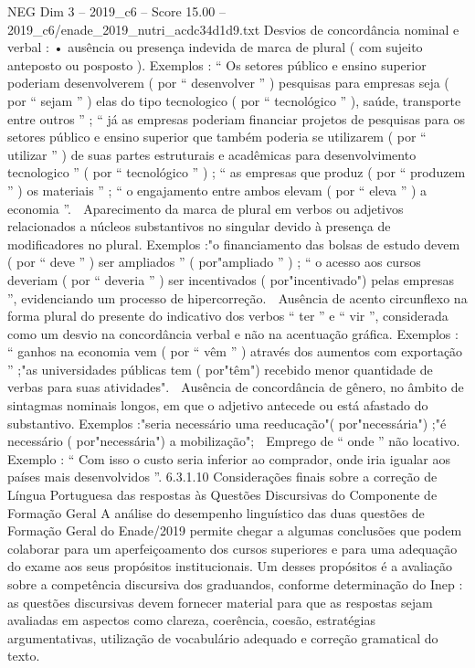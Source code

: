 \begin{textsample}{NEG Dim 3 – 2019\_c6 – Score 15.00 – 2019\_c6/enade\_2019\_nutri\_acdc34d1d9.txt}
Desvios de concordância nominal e verbal : • ausência ou presença indevida de marca de plural ( com sujeito anteposto ou posposto ).
Exemplos : “ Os setores público e ensino superior poderiam desenvolverem ( por “ desenvolver ” ) pesquisas para empresas seja ( por “ sejam ” ) elas do tipo tecnologico ( por “ tecnológico ” ), saúde, transporte entre outros ” ; “ já as empresas poderiam financiar projetos de pesquisas para os setores público e ensino superior que também poderia se utilizarem ( por “ utilizar ” ) de suas partes estruturais e acadêmicas para desenvolvimento tecnologico ” ( por “ tecnológico ” ) ; “ as empresas que produz ( por “ produzem ” ) os materiais ” ; “ o engajamento entre ambos elevam ( por “ eleva ” ) a economia ”.  Aparecimento da marca de plural em verbos ou adjetivos relacionados a núcleos substantivos no singular devido à presença de modificadores no plural.
Exemplos :"o financiamento das bolsas de estudo devem ( por “ deve ” ) ser ampliados ” ( por"ampliado ” ) ; “ o acesso aos cursos deveriam ( por “ deveria ” ) ser incentivados ( por"incentivado") pelas empresas ”, evidenciando um processo de hipercorreção.  Ausência de acento circunflexo na forma plural do presente do indicativo dos verbos “ ter ” e “ vir ”, considerada como um desvio na concordância verbal e não na acentuação gráfica.
Exemplos : “ ganhos na economia vem ( por “ vêm ” ) através dos aumentos com exportação ” ;"as universidades públicas tem ( por"têm") recebido menor quantidade de verbas para suas atividades".  Ausência de concordância de gênero, no âmbito de sintagmas nominais longos, em que o adjetivo antecede ou está afastado do substantivo.
Exemplos :"seria necessário uma reeducação"( por"necessária") ;"é necessário ( por"necessária") a mobilização";  Emprego de “ onde ” não locativo.
Exemplo : “ Com isso o custo seria inferior ao comprador, onde iria igualar aos países mais desenvolvidos ”. 6.3.1.10 Considerações finais sobre a correção de Língua Portuguesa das respostas às Questões Discursivas do Componente de Formação Geral A análise do desempenho linguístico das duas questões de Formação Geral do Enade/2019 permite chegar a algumas conclusões que podem colaborar para um aperfeiçoamento dos cursos superiores e para uma adequação do exame aos seus propósitos institucionais.
Um desses propósitos é a avaliação sobre a competência discursiva dos graduandos, conforme determinação do Inep : as questões discursivas devem fornecer material para que as respostas sejam avaliadas em aspectos como clareza, coerência, coesão, estratégias argumentativas, utilização de vocabulário adequado e correção gramatical do texto.

\end{textsample}
